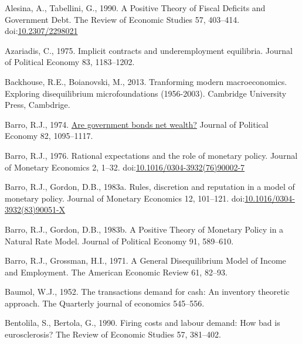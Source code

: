 \documentclass[]{elsarticle} %
\newlength{\cslhangindent}
\newlength{\cslentryspacingunit} %
\newenvironment{CSLReferences}[2] %
 {%
  \setlength{\parindent}{0pt}
  \ifodd #1
  \let\oldpar\par
  \def\par{\hangindent=\cslhangindent\oldpar}
  \fi
  \setlength{\parskip}{#2\cslentryspacingunit}
 }%
 {}
\begin{document}
\hypertarget{refs}{}
\begin{CSLReferences}{1}{0}
\leavevmode{}%
Alesina, A., Tabellini, G., 1990. A {Positive Theory} of {Fiscal
Deficits} and {Government Debt}. The Review of Economic Studies 57,
403--414. doi:\href{https://doi.org/10.2307/2298021}{10.2307/2298021}

\leavevmode{}%
Azariadis, C., 1975. Implicit contracts and underemployment equilibria.
Journal of Political Economy 83, 1183--1202.

\leavevmode{}%
Backhouse, R.E., Boianovski, M., 2013. Tranforming modern
macroeconomics. {Exploring} disequilibrium microfoundations (1956-2003).
{Cambridge University Press}, {Cambdrige}.

\leavevmode{}%
Barro, R.J., 1974. \href{http://www.jstor.org/stable/1830663}{Are
government bonds net wealth?} Journal of Political Economy 82,
1095--1117.

\leavevmode{}%
Barro, R.J., 1976. Rational expectations and the role of monetary
policy. Journal of Monetary Economics 2, 1--32.
doi:\href{https://doi.org/10.1016/0304-3932(76)90002-7}{10.1016/0304-3932(76)90002-7}

\leavevmode{}%
Barro, R.J., Gordon, D.B., 1983a. Rules, discretion and reputation in a
model of monetary policy. Journal of Monetary Economics 12, 101--121.
doi:\href{https://doi.org/10.1016/0304-3932(83)90051-X}{10.1016/0304-3932(83)90051-X}

\leavevmode{}%
Barro, R.J., Gordon, D.B., 1983b. A {Positive Theory} of {Monetary
Policy} in a {Natural Rate Model}. Journal of Political Economy 91,
589--610.

\leavevmode{}%
Barro, R.J., Grossman, H.I., 1971. A {General Disequilibrium Model} of
{Income} and {Employment}. The American Economic Review 61, 82--93.

\leavevmode{}%
Baumol, W.J., 1952. The transactions demand for cash: {An} inventory
theoretic approach. The Quarterly journal of economics 545--556.

\leavevmode{}%
Bentolila, S., Bertola, G., 1990. Firing costs and labour demand: How
bad is eurosclerosis? The Review of Economic Studies 57, 381--402.


\end{CSLReferences}
\end{document}

